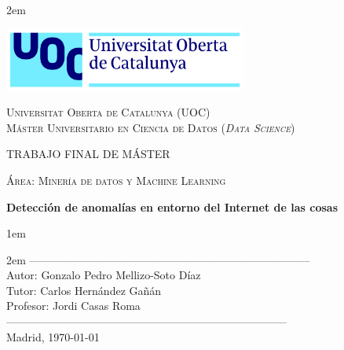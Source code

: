 \newpage
\thispagestyle{empty}

\baselineskip 2em


\centerline{\includegraphics[width=0.6\textwidth]{images/UOC-logo}}
\begin{center}
\textsc{Universitat Oberta de Catalunya (UOC) \\
 Máster Universitario en Ciencia de Datos (\textit{Data Science})\\}


\vspace*{1.5cm}

\textsc{\Large TRABAJO FINAL DE MÁSTER}

\vspace*{0.5cm}

\textsc{\large Área: Minería de datos y Machine Learning}



\vspace*{2.0cm}

\textbf{\Large Detección de anomalías en entorno del Internet de las cosas}


\vspace{2.5cm}
\baselineskip 1em

\baselineskip 2em
-----------------------------------------------------------------------------\\
Autor:      Gonzalo Pedro Mellizo-Soto Díaz\\
Tutor:      Carlos Hernández Gañán \\
Profesor:   Jordi Casas Roma \\
-----------------------------------------------------------------------------\\
\vspace*{1.5cm}
Madrid, \today

\end{center}

\newpage
\pagestyle{empty}
\hfill

